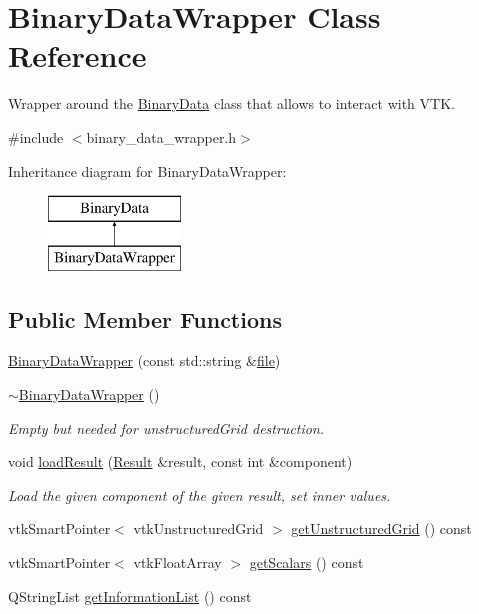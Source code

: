 \hypertarget{classBinaryDataWrapper}{}\section{Binary\+Data\+Wrapper Class Reference}
\label{classBinaryDataWrapper}


Wrapper around the \hyperlink{classBinaryData}{Binary\+Data} class that allows to interact with V\+TK.  




{\ttfamily \#include $<$binary\+\_\+data\+\_\+wrapper.\+h$>$}

Inheritance diagram for Binary\+Data\+Wrapper\+:\begin{figure}[H]
\begin{center}
\leavevmode
\includegraphics[height=2.000000cm]{dc/d6a/classBinaryDataWrapper}
\end{center}
\end{figure}
\subsection*{Public Member Functions}
\begin{DoxyCompactItemize}
\item 
\hyperlink{classBinaryDataWrapper_a3b8e761eca3c776aa55de4926e9eba8d}{Binary\+Data\+Wrapper} (const std\+::string \&\hyperlink{classBinaryData_a9eae74bdf3b91a3e1461802d820591e3}{file})
\item 
\hyperlink{classBinaryDataWrapper_aab9bf6a3b5a0a267b12bdf65bc44a5de}{$\sim$\+Binary\+Data\+Wrapper} ()
\begin{DoxyCompactList}\small\item\em Empty but needed for unstructured\+Grid destruction. \end{DoxyCompactList}\item 
void \hyperlink{classBinaryDataWrapper_a1cbd933061a05f42ca7ab95cbc951c98}{load\+Result} (\hyperlink{classResult}{Result} \&result, const int \&component)
\begin{DoxyCompactList}\small\item\em Load the given component of the given result, set inner values. \end{DoxyCompactList}\item 
vtk\+Smart\+Pointer$<$ vtk\+Unstructured\+Grid $>$ \hyperlink{classBinaryDataWrapper_a4ab331926387a422e4275f57f37f8f5e}{get\+Unstructured\+Grid} () const
\item 
vtk\+Smart\+Pointer$<$ vtk\+Float\+Array $>$ \hyperlink{classBinaryDataWrapper_a047b8ec79270082144bcb1c990bc4a91}{get\+Scalars} () const
\item 
Q\+String\+List \hyperlink{classBinaryDataWrapper_a7b0d2b52b89c0edf1bfdecf808179efa}{get\+Information\+List} () const
\end{DoxyCompactItemize}
